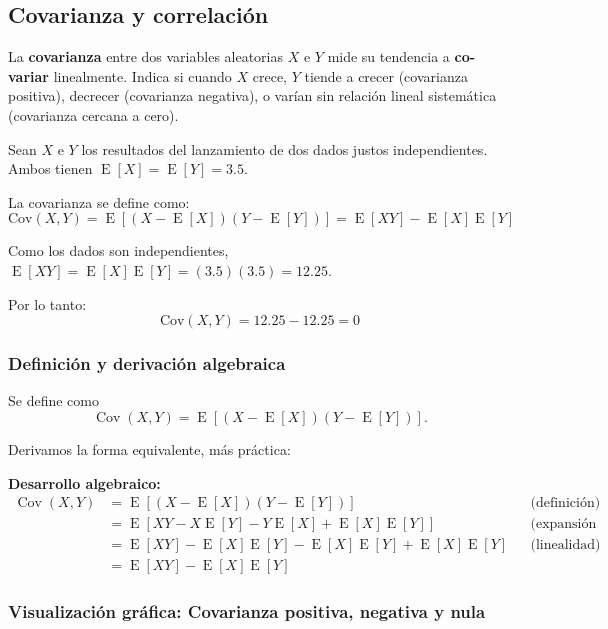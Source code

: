 \documentclass[11pt,a4paper]{article}
\DeclareMathOperator{\E}{E}
\DeclareMathOperator{\Cov}{Cov}
\begin{document}
\subsection{Covarianza y correlación}

\begin{concepto}
La \textbf{covarianza} entre dos variables aleatorias \(X\) e \(Y\) mide su tendencia a \textbf{co-variar} linealmente. Indica si cuando \(X\) crece, \(Y\) tiende a crecer (covarianza positiva), decrecer (covarianza negativa), o varían sin relación lineal sistemática (covarianza cercana a cero).
\end{concepto}

\begin{ejemplo}
Sean \(X\) e \(Y\) los resultados del lanzamiento de dos dados justos independientes. Ambos tienen \(\E[X] = \E[Y] = 3.5\).

La covarianza se define como:
\[
\text{Cov}(X,Y) = \E[(X - \E[X])(Y - \E[Y])] = \E[XY] - \E[X]\E[Y]
\]

Como los dados son independientes, \(\E[XY] = \E[X]\E[Y] = (3.5)(3.5) = 12.25\).

Por lo tanto:
\[
\text{Cov}(X,Y) = 12.25 - 12.25 = 0
\]


\end{ejemplo}

\subsubsection*{Definición y derivación algebraica}

Se define como
\[
\boxed{\Cov(X,Y)=\E\left[(X-\E[X])(Y-\E[Y])\right]}.
\]

Derivamos la forma equivalente, más práctica:

\noindent\textbf{Desarrollo algebraico:}
\begin{align}
\Cov(X,Y) &= \E\left[(X-\E[X])(Y-\E[Y])\right] && \text{(definición)}\\
&= \E\left[XY - X\E[Y] - Y\E[X] + \E[X]\E[Y]\right] && \text{(expansión del producto)}\\
&= \E[XY] - \E[X]\E[Y] - \E[X]\E[Y] + \E[X]\E[Y] && \text{(linealidad)}\\
&\boxed{= \E[XY] - \E[X]\E[Y]}
\end{align}

\subsubsection*{Visualización gráfica: Covarianza positiva, negativa y nula}
\end{document}
